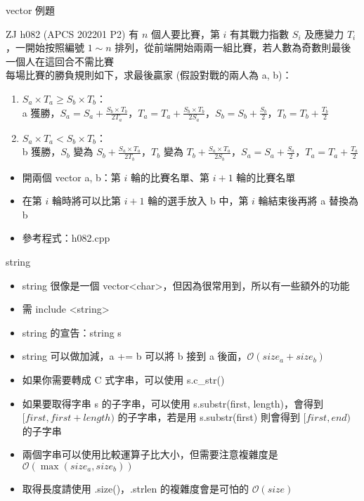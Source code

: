\documentclass[aspectratio=169]{beamer}
\begin{document}
    \begin{frame}{vector 例題}
        \begin{block}{ZJ h082 (APCS 202201 P2)}
            有 $n$ 個人要比賽，第 $i$ 有其戰力指數 $S_i$ 及應變力 $T_i$，一開始按照編號 $1 \sim n$ 排列，從前端開始兩兩一組比賽，若人數為奇數則最後一個人在這回合不需比賽\\
            每場比賽的勝負規則如下，求最後贏家 (假設對戰的兩人為 a, b)：
            \begin{enumerate}
                \item $S_a \times T_a \ge S_b \times T_b$：\\a 獲勝，$S_a = S_a + \frac{S_b \times T_b}{2T_a}$，$T_a = T_a + \frac{S_b \times T_b}{2S_a}$，$S_b = S_b + \frac{S_b}{2}$，$T_b = T_b + \frac{T_b}{2}$
                \item $S_a \times T_a < S_b \times T_b$：\\b 獲勝，$S_b$ 變為 $S_b + \frac{S_a \times T_a}{2T_b}$，$T_b$ 變為 $T_b + \frac{S_a \times T_a}{2S_b}$，$S_a = S_a + \frac{S_a}{2}$，$T_a = T_a + \frac{T_a}{2}$
            \end{enumerate}
        \end{block}

        \begin{itemize}
            \item<2-> 開兩個 vector a, b：第 $i$ 輪的比賽名單、第 $i + 1$ 輪的比賽名單
            \item<3-> 在第 $i$ 輪時將可以比第 $i+1$ 輪的選手放入 b 中，第 $i$ 輪結束後再將 a 替換為 b
            \item<3-> 參考程式：h082.cpp
        \end{itemize}
    \end{frame}

    \begin{frame}{string}
        \begin{itemize}
            \item<1-> string 很像是一個 vector<char>，但因為很常用到，所以有一些額外的功能
            \item<1-> 需 include <string>
            \item<2-> string 的宣告：string s
            \item<3-> string 可以做加減，a += b 可以將 b 接到 a 後面，$\mathcal{O}(size_a+size_b)$
            \item<4-> 如果你需要轉成 C 式字串，可以使用 s.c\_str()
            \item<4-> 如果要取得字串 s 的子字串，可以使用 s.substr(first, length)，會得到 $[first, first + length)$ 的子字串，若是用 s.substr(first) 則會得到 $[first, end)$ 的子字串
            \item<5-> 兩個字串可以使用比較運算子比大小，但需要注意複雜度是 $\mathcal{O}(\max(size_a, size_b))$
            \item<6-> 取得長度請使用 .size()，.strlen 的複雜度會是可怕的 $\mathcal{O}(size)$
        \end{itemize}
    \end{frame}
\end{document}
